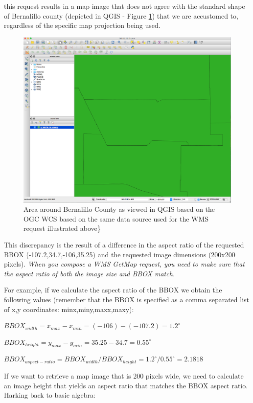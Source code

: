 \documentclass[]{book}
\begin{document}
this request results in a map image that does not agree with the
standard shape of Bernalillo county (depicted in QGIS - Figure
\ref{fig:bernalillo-qgis}) that we are accustomed to, regardless of the
specific map projection being used.

\begin{figure}[htbp]
\centering
\includegraphics{images/bernalillo_qgis.png}
\caption{Area around Bernalillo County as viewed in QGIS based on the
OGC WCS based on the same data source used for the WMS request
illustrated above\}\label{fig:bernalillo-qgis}}
\end{figure}

This discrepancy is the result of a difference in the aspect ratio of
the requested BBOX (-107.2,34.7,-106,35.25) and the requested image
dimensions (200x200 pixels). \emph{When you compose a WMS GetMap
request, you need to make sure that the aspect ratio of both the image
size and BBOX match.}

For example, if we calculate the aspect ratio of the BBOX we obtain the
following values (remember that the BBOX is specified as a comma
separated list of x,y coordinates: minx,miny,maxx,maxy):

\(BBOX_{width} = x_{max} - x_{min} = (-106) - (-107.2) = 1.2^{\circ}\)

\(BBOX_{height} = y_{max} - y_{min} = 35.25 - 34.7 = 0.55^{\circ}\)

\(BBOX_{aspect-ratio} = BBOX_{width} / BBOX_{height} = 1.2^{\circ} / 0.55^{\circ} = 2.1818\)

If we want to retrieve a map image that is 200 pixels wide, we need to
calculate an image height that yields an aspect ratio that matches the
BBOX aspect ratio. Harking back to basic algebra:
\end{document}
